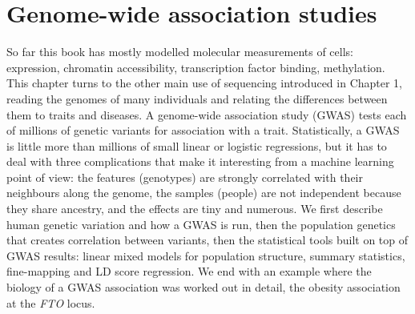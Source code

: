 
\providecommand{\R}{\mathbb{R}}
\providecommand{\E}{\mathbb{E}}
\providecommand{\Normal}{\mathcal{N}}
\providecommand{\argmax}{\operatorname*{arg\,max}}
\providecommand{\argmin}{\operatorname*{arg\,min}}
\providecommand{\vy}{\mathbf{y}}
\providecommand{\vx}{\mathbf{x}}
\providecommand{\mX}{\mathbf{X}}
\providecommand{\mI}{\mathbf{I}}
\providecommand{\vb}{\boldsymbol{\beta}}
\providecommand{\veps}{\boldsymbol{\epsilon}}
\providecommand{\vp}{\mathbf{p}}
\providecommand{\vg}{\mathbf{g}}
\providecommand{\ind}{\mathbf{1}}
\providecommand{\vz}{\mathbf{z}}
\providecommand{\vzh}{\hat{\mathbf{z}}}
\providecommand{\ve}{\mathbf{e}}
\providecommand{\vu}{\mathbf{u}}
\providecommand{\vr}{\mathbf{r}}
\providecommand{\va}{\mathbf{a}}
\providecommand{\vc}{\mathbf{c}}
\providecommand{\vone}{\mathbf{1}}
\providecommand{\vgamma}{\boldsymbol{\gamma}}
\providecommand{\vtheta}{\boldsymbol{\theta}}
\providecommand{\vlambda}{\boldsymbol{\lambda}}
\providecommand{\mR}{\mathbf{R}}
\providecommand{\mK}{\mathbf{K}}
\providecommand{\mU}{\mathbf{U}}
\providecommand{\mS}{\mathbf{S}}
\providecommand{\mC}{\mathbf{C}}
\providecommand{\mA}{\mathbf{A}}
\providecommand{\mH}{\mathbf{H}}
\providecommand{\mZ}{\mathbf{Z}}
\providecommand{\Var}{\operatorname{Var}}
\providecommand{\Cov}{\operatorname{Cov}}
\providecommand{\logit}{\operatorname{logit}}

\providecommand{\chaptertoc}{}
\chapter{Genome-wide association studies}
\label{ch:gwas}
\chaptertoc

So far this book has mostly modelled molecular measurements of cells: expression, chromatin accessibility, transcription factor binding, methylation. This chapter turns to the other main use of sequencing introduced in Chapter 1, reading the genomes of many individuals and relating the differences between them to traits and diseases. A genome-wide association study (GWAS) tests each of millions of genetic variants for association with a trait. Statistically, a GWAS is little more than millions of small linear or logistic regressions, but it has to deal with three complications that make it interesting from a machine learning point of view: the features (genotypes) are strongly correlated with their neighbours along the genome, the samples (people) are not independent because they share ancestry, and the effects are tiny and numerous. We first describe human genetic variation and how a GWAS is run, then the population genetics that creates correlation between variants, then the statistical tools built on top of GWAS results: linear mixed models for population structure, summary statistics, fine-mapping and LD score regression. We end with an example where the biology of a GWAS association was worked out in detail, the obesity association at the \textit{FTO} locus.

